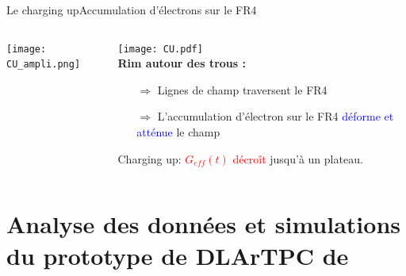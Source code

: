         \begin{frame}{Le charging up}{Accumulation d'électrons sur le FR4}
            \begin{scriptsize}
                \begin{columns}
           			\begin{column}{0.5\textwidth}
               			\texttt{[image: CU\_ampli.png]}
           			\end{column}\hfill
           			\begin{column}{0.5\textwidth}
           				\texttt{[image: CU.pdf]}\\\vspace{1cm}
               			\textbf{Rim autour des trous :}
           				\begin{itemize}
           					\item[$\Rightarrow$] Lignes de champ traversent le FR4\\
           					\item[$\Rightarrow$] L'accumulation d'électron sur le FR4 \textcolor{blue}{déforme et atténue} le champ
           				\end{itemize}
           				Charging up: \textcolor{red}{$G_{eff}(t)$ décroît} jusqu'à un plateau.
               		\end{column}
               	\end{columns}
            \end{scriptsize}
        \end{frame}

    
    
    \section[\TOO{}]{Analyse des données et simulations du prototype de DLArTPC de \TOO{}}
    
